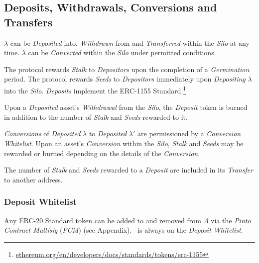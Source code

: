 \documentclass[tikz]{article}
\newcommand{\term}[1]{\textsl{#1}}
\newcommand{\fref}[1]{\footnote{\href{http://#1}{#1}}}
\newcommand{\Pinto}{} %
\begin{document}

\vspace*{-1.2mm}
\subsection{Deposits, Withdrawals, Conversions and Transfers}
\vspace*{-1.2mm}

$\lambda$ can be \term{Deposited} into, \term{Withdrawn} from and \term{Transferred} within the \term{Silo} at any time. $\lambda$ can be \term{Converted} within the \term{Silo} under permitted conditions. 

The protocol rewards \term{Stalk} to \term{Depositors} upon the completion of a \term{Germination} period. The protocol rewards \term{Seeds} to \term{Depositors} immediately upon \term{Depositing} $\lambda$ into the \term{Silo}. \term{Deposits} implement the ERC-1155 Standard.\fref{ethereum.org/en/developers/docs/standards/tokens/erc-1155}

Upon a \term{Deposited} asset's \term{Withdrawal} from the \term{Silo}, the \term{Deposit} token is burned in addition to the number of \term{Stalk} and \term{Seeds} rewarded to it. 

\term{Conversions} of \term{Deposited} $\lambda$ to \term{Deposited} $\lambda'$ are permissioned by a \term{Conversion Whitelist}. Upon an asset's \term{Conversion} within the \term{Silo}, \term{Stalk} and \term{Seeds} may be rewarded or burned depending on the details of the \term{Conversion}.

The number of \term{Stalk} and \term{Seeds} rewarded to a \term{Deposit} are included in its \term{Transfer} to another address.


\subsubsection{Deposit Whitelist}

Any ERC-20 Standard token can be added to and removed from $\Lambda$ via the \term{Pinto Contract Multisig} (\term{PCM}) (see Appendix). \Pinto\ is always on the \term{Deposit Whitelist}.
\end{document}
